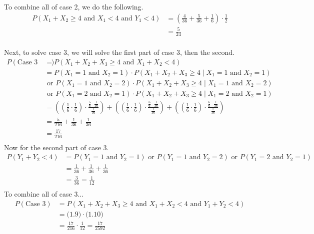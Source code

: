 \documentclass{article}
\numberwithin{equation}{section}
\newcommand{\A}{\text{ and }}
\newcommand{\R}{\text{ or }}
\newcommand{\eqname}[1]{\tag*{#1}}%
\begin{document}
To combine all of case 2, we do the following.
\begin{align} 
	    \label{P(X1+X2≥4 and X1<4 and Y1<4)}
        P(X_1 + X_2 \geq 4 \A X_1 < 4 \A Y_1 < 4) &= (\frac{4}{36} + \frac{5}{36} + \frac{1}{6}) \cdot \frac{1}{2}  \eqname{} \\
        &= \frac{5}{24}  \eqname{} \\
\end{align}

Next, to solve case 3, we will solve the first part of case 3, then the second.
\begin{align} 
	    \label{Case 3 (first part)}
	    P(\text{Case 3 (first part)}) &= P(X_1 + X_2 + X_3 \geq 4 \A X_1 + X_2 < 4) \eqname{Using (2.4)} \\
        &= P(X_1 = 1 \A X_2 = 1) \cdot P(X_1 + X_2 + X_3 \geq 4 \mid X_1 = 1 \A  X_2 = 1) \eqname{} \\
        & \R P(X_1 = 1 \A X_2 = 2) \cdot P(X_1 + X_2 + X_3 \geq 4 \mid X_1 = 1 \A  X_2 = 2) \eqname{} \\
        & \R P(X_1 = 2 \A X_2 = 1) \cdot P(X_1 + X_2 + X_3 \geq 4 \mid X_1 = 2 \A  X_2 = 1) \eqname{} \\
        &= \left((\frac{1}{6} \cdot \frac{1}{6}) \cdot \frac{\frac{5}{6} \cdot \frac{1}{36}}{\frac{1}{36}} \right) + \left((\frac{1}{6} \cdot \frac{1}{6}) \cdot \frac{\frac{6}{6} \cdot \frac{1}{36}}{\frac{1}{36}} \right) + \left((\frac{1}{6} \cdot \frac{1}{6}) \cdot \frac{\frac{6}{6} \cdot \frac{1}{36}}{\frac{1}{36}} \right) \eqname{} \\
        &= \frac{5}{216} + \frac{1}{36} + \frac{1}{36} \eqname{} \\
        &= \frac{17}{216}  \eqname{} \\
\end{align}
Now for the second part of case 3.
\begin{align} 
	    \label{P(Y1+Y2<4)=P(Y1=1 and Y2=1)}
	    P(Y_1 + Y_2 < 4) &= P(Y_1 = 1 \A Y_2 = 1) \R P(Y_1 = 1 \A Y_2 = 2) \R P(Y_1 = 2 \A Y_2 = 1) \eqname{Using (2.7) (2.8)} \\
	    &= \frac{1}{36} + \frac{1}{36} + \frac{1}{36} \eqname{} \\
	    & = \frac{3}{36} = \frac{1}{12} \eqname{} \\
\end{align}
To combine all of case 3...
\begin{align} 
	    \label{Case 3 Total}
	    P(\text{Case 3}) &= P(X_1 + X_2 + X_3 \geq 4 \A X_1 + X_2 < 4 \A Y_1 + Y_2 < 4) \eqname{Using (2.7) (2.8)} \\
	    &= \text{(1.9)} \cdot \text{(1.10)} \eqname{Using (2.4) (2.6)} \\
	    &= \frac{17}{216} \cdot \frac{1}{12} = \frac{17}{2592} \eqname{} \\
\end{align}
\end{document}
